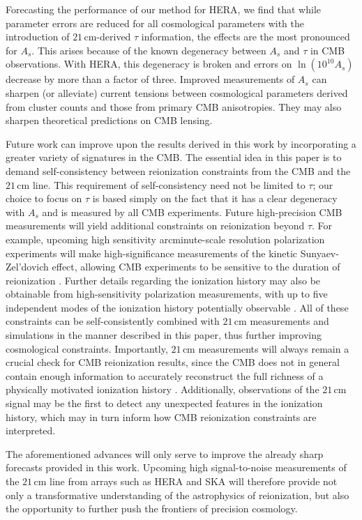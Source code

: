 \documentclass[twocolumn,aps,prd,nofootinbib,showpacs]{revtex4-1}
\begin{document}
Forecasting the performance of our method for HERA, we find that while parameter errors are reduced for all cosmological parameters with the introduction of $21\,\textrm{cm}$-derived $\tau$ information, the effects are the most pronounced for $A_s$. This arises because of the known degeneracy between $A_s$ and $\tau$ in CMB observations. With HERA, this degeneracy is broken and errors on $\ln (10^{10} A_s)$ decrease by more than a factor of three. Improved measurements of $A_s$ can sharpen (or alleviate) current tensions between cosmological parameters derived from cluster counts and those from primary CMB anisotropies. They may also sharpen theoretical predictions on CMB lensing.

Future work can improve upon the results derived in this work by incorporating a greater variety of signatures in the CMB. The essential idea in this paper is to demand self-consistency between reionization constraints from the CMB and the $21\,\textrm{cm}$ line. This requirement of self-consistency need not be limited to $\tau$; our choice to focus on $\tau$ is based simply on the fact that it has a clear degeneracy with $A_s$ and is measured by all CMB experiments. Future high-precision CMB measurements will yield additional constraints on reionization beyond $\tau$. For example, upcoming high sensitivity arcminute-scale resolution polarization experiments will make high-significance measurements of the kinetic Sunyaev-Zel'dovich effect, allowing CMB experiments to be sensitive to the duration of reionization \cite{calabrese_et_al2014}. Further details regarding the ionization history may also be obtainable from high-sensitivity polarization measurements, with up to five independent modes of the ionization history potentially observable \cite{mortonson_and_hu2008}. All of these constraints can be self-consistently combined with $21\,\textrm{cm}$ measurements and simulations in the manner described in this paper, thus further improving cosmological constraints. Importantly, $21\,\textrm{cm}$ measurements will always remain a crucial check for CMB reionization results, since the CMB does not in general contain enough information to accurately reconstruct the full richness of a physically motivated ionization history \cite{MoradinezhadDizgah_et_al2013}. Additionally, observations of the $21\,\textrm{cm}$ signal may be the first to detect any unexpected features in the ionization history, which may in turn inform how CMB reionization constraints are interpreted.

The aforementioned advances will only serve to improve the already sharp forecasts provided in this work. Upcoming high signal-to-noise measurements of the $21\,\textrm{cm}$ line from arrays such as HERA and SKA will therefore provide not only a transformative understanding of the astrophysics of reionization, but also the opportunity to further push the frontiers of precision cosmology.
\end{document}
